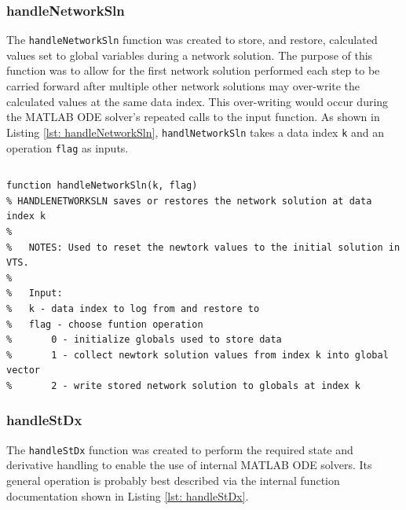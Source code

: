 \subsubsection{handleNetworkSln}  
The \verb|handleNetworkSln| function was created to store, and restore, calculated values set to global variables during a network solution.
The purpose of this function was to allow for the first network solution performed each step to be carried forward after multiple other network solutions may over-write the calculated values at the same data index.
This over-writing would occur during the MATLAB ODE solver's repeated calls to the input function.
As shown in Listing \ref{lst: handleNetworkSln}, \verb|handlNetworkSln| takes a data index \verb|k| and an operation \verb|flag| as inputs.

\begin{lstlisting}[caption={Function Header for handleNetworkSln},label={lst: handleNetworkSln}]
\end{lstlisting}\vspace{-2 em}
\begin{verbatim}
function handleNetworkSln(k, flag)
% HANDLENETWORKSLN saves or restores the network solution at data index k
%
%   NOTES: Used to reset the newtork values to the initial solution in VTS.
%
%   Input:
%   k - data index to log from and restore to
%   flag - choose funtion operation
%       0 - initialize globals used to store data
%       1 - collect newtork solution values from index k into global vector
%       2 - write stored network solution to globals at index k
\end{verbatim}

\pagebreak
\subsubsection{handleStDx}  
The \verb|handleStDx| function was created to perform the required state and derivative handling to enable the use of internal MATLAB ODE solvers.
Its general operation is probably best described via the internal function documentation shown in Listing \ref{lst: handleStDx}.

